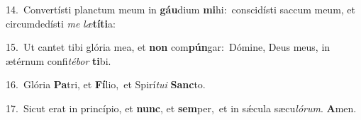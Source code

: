 {\numbfont\textcolor{\numbcolor}{14.}}~Convertísti planctum meum in \textbf{gáu}\-dium \textbf{mi}\-hi:~\star conscidísti saccum meum, et circumdedísti \textit{me} \textit{læ}\-\textbf{tí}\textbf{ti}a:\par
{\numbfont\textcolor{\numbcolor}{15.}}~Ut cantet tibi glória mea, et \textbf{non} com\-\textbf{pún}\-gar:~\star Dómine, Deus meus, in ætérnum confi\-\textit{té}\-\textit{bor} \textbf{ti}\-bi.\par
{\numbfont\textcolor{\numbcolor}{16.}}~Glória \textbf{Pa}\-tri, et \textbf{Fí}\-lio,~\star et Spirí\-\textit{tu}\-\textit{i} \textbf{Sanc}\-to.\par
{\numbfont\textcolor{\numbcolor}{17.}}~Sicut erat in princípio, et \textbf{nunc}\-, et \textbf{sem}\-per,~\star et in sǽcula sæcu\-\textit{ló}\-\textit{rum}. \textbf{A}\-men.\par
